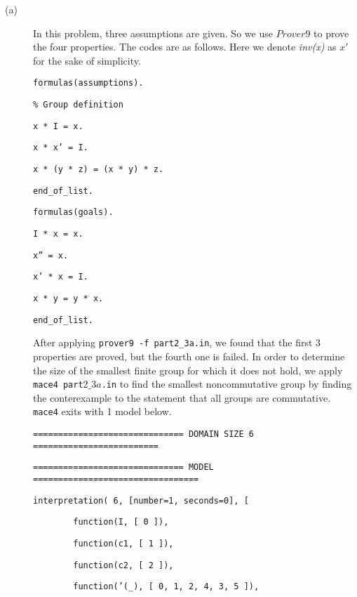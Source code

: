 \begin{description}
  \item[(a)] In this problem, three assumptions are given. So we use $Prover9$ to prove the four properties. The codes are as follows. Here we denote \emph{inv(x)} as $x'$ for the sake of simplicity.
      
\vspace{2mm}

{\footnotesize

{\tt formulas(assumptions).}

{\tt \% Group definition}

{\tt x * I = x.}

{\tt x * x' = I.}

{\tt x * (y * z) = (x * y) * z.}

{\tt end\_of\_list.}

{\tt formulas(goals).}

{\tt I * x = x.}

{\tt x'' = x.}

{\tt x' * x = I.}

{\tt x * y = y * x.}

{\tt end\_of\_list.}

}

\vspace{2mm}

  After applying {\tt prover9 -f part2\_3a.in}, we found that the first 3 properties are proved, but the fourth one is failed. In order to determine the size of the smallest finite group for which it does not hold, we apply {\tt mace4 part$2\_3a$.in} to find the smallest noncommutative group by finding the conterexample to the statement that all groups are commutative. {\tt mace4} exits with 1 model below.
  
\vspace{2mm}
  
{\tt ============================== DOMAIN SIZE 6 =========================}

{\tt ============================== MODEL =================================}

{\tt interpretation( 6, [number=1, seconds=0], [}

{\tt \ \ \ \ \ \ \ \ function(I, [ 0 ]),}

{\tt \ \ \ \ \ \ \ \ function(c1, [ 1 ]),}

{\tt \ \ \ \ \ \ \ \ function(c2, [ 2 ]),}

{\tt \ \ \ \ \ \ \ \ function('(\_), [ 0, 1, 2, 4, 3, 5 ]),}


\end{description}

